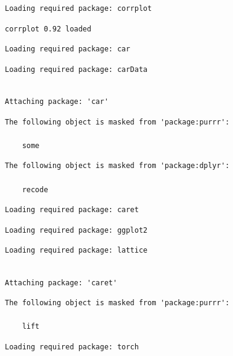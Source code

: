 \documentclass[
  letterpaper,
  DIV=11,
  numbers=noendperiod]{scrartcl}
\begin{document}
\begin{verbatim}
Loading required package: corrplot
\end{verbatim}

\begin{verbatim}
corrplot 0.92 loaded
\end{verbatim}

\begin{verbatim}
Loading required package: car
\end{verbatim}

\begin{verbatim}
Loading required package: carData
\end{verbatim}

\begin{verbatim}

Attaching package: 'car'
\end{verbatim}

\begin{verbatim}
The following object is masked from 'package:purrr':

    some
\end{verbatim}

\begin{verbatim}
The following object is masked from 'package:dplyr':

    recode
\end{verbatim}

\begin{verbatim}
Loading required package: caret
\end{verbatim}

\begin{verbatim}
Loading required package: ggplot2
\end{verbatim}

\begin{verbatim}
Loading required package: lattice
\end{verbatim}

\begin{verbatim}

Attaching package: 'caret'
\end{verbatim}

\begin{verbatim}
The following object is masked from 'package:purrr':

    lift
\end{verbatim}

\begin{verbatim}
Loading required package: torch
\end{verbatim}
\end{document}
